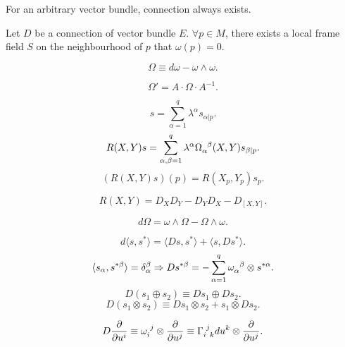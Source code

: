 \begin{newthem}
For an arbitrary vector bundle, connection always exists.
\end{newthem}

\begin{newthem} 
Let $D$ be a connection of vector bundle $E$. $\forall p \in M$, there exists a local frame field $S$ on the neighbourhood of $p$ that $\omega(p) =0$.
\end{newthem}

\begin{newdef}
\[\Omega \equiv d\omega - \omega \wedge \omega.\]
\end{newdef}

\begin{newprop}
\[\Omega' = A \cdot \Omega \cdot A^{-1}.\]
\end{newprop}

\begin{newdef}
\[s = \sum_{\alpha=1}^{q} \lambda^{\alpha} s_{\alpha|p}.\]
\[R(X,Y)s = \sum_{\alpha,\beta=1}^{q} \lambda^{\alpha} \tensor{\Omega}{_\alpha^\beta}(X,Y)s_{\beta|p}.\]
\[(R(X,Y)s)(p) = R(X_p,Y_p)s_p.\]
\end{newdef}

\begin{newprop}
\[R(X,Y) = D_X D_Y - D_Y D_X -D_{[X,Y]}.\]
\end{newprop}

\begin{newthem}
\[d\Omega = \omega \wedge \Omega - \Omega \wedge \omega.\]
\end{newthem}

\begin{newdef}
\[d\langle s,s^* \rangle = \langle Ds,s^* \rangle + \langle s,Ds^* \rangle.\]
\[\langle s_{\alpha},s^{*\beta} \rangle  = \delta^{\beta}_{\alpha}  \Rightarrow Ds^{*\beta} = -\sum_{\alpha=1}^{q} \tensor{\omega}{_\alpha^\beta} \otimes s^{*\alpha}.\]
\[D(s_1 \oplus s_2) \equiv Ds_1 \oplus Ds_2.\]
\[D(s_1 \otimes s_2) \equiv Ds_1 \otimes s_2 + s_1 \otimes Ds_2.\]
\end{newdef}

\begin{newdef}
\[D\frac{\partial}{\partial u^i} \equiv \tensor{\omega}{_i^j} \otimes \frac{\partial}{\partial u^j} \equiv \tensor{\Gamma}{_i^j_k} du^k \otimes \frac{\partial}{\partial u^j}.\]
\end{newdef}

